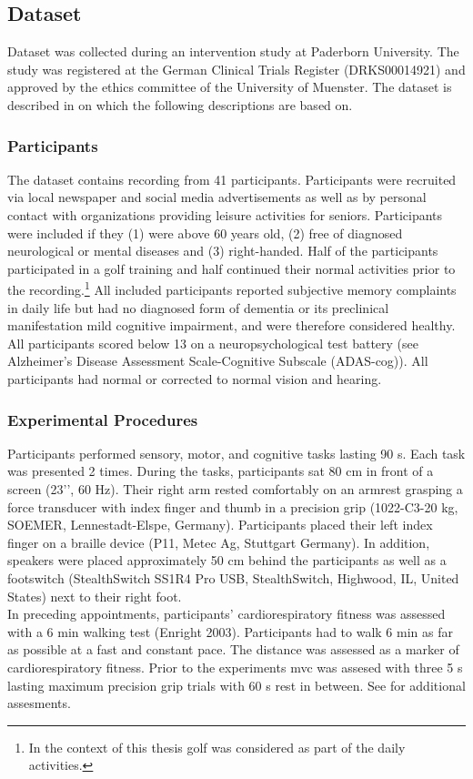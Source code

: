 \subsection{Dataset }
\label{methods:datasets:III}
Dataset  was collected during an intervention study at Paderborn University. The study was registered at the German Clinical Trials Register (DRKS00014921) and approved by the ethics committee of the University of Muenster. The dataset is described in \cite{Goelz2021b} on which the following descriptions are based on.

\subsubsection{Participants}
\label{methods:datasets:III:participants}
The dataset contains recording from 41 participants. Participants were recruited via local newspaper and social media advertisements as well as by personal contact with organizations providing leisure activities for seniors. Participants were included if they (1) were above 60 years old, (2) free of diagnosed neurological or mental diseases and (3) right-handed. Half of the participants participated in a golf training and half continued their normal activities prior to the recording.\footnote{In the context of this thesis golf was considered as part of the daily activities.} All included participants reported subjective memory complaints in daily life but had no diagnosed form of dementia or its preclinical manifestation mild cognitive impairment, and were therefore considered healthy. All participants scored below 13 on a neuropsychological test battery (see Alzheimer’s Disease Assessment Scale-Cognitive Subscale (ADAS-cog)). All participants had normal or corrected to normal vision and hearing.\\

\subsubsection{Experimental Procedures}
\label{methods:datasets:II:experiment}
Participants performed sensory, motor, and cognitive tasks lasting 90 s. Each task was presented 2 times. During the tasks, participants sat 80 cm in front of a screen (23’’, 60 Hz). Their right arm rested comfortably on an armrest grasping a force transducer with index finger and thumb in a precision grip (1022-C3-20 kg, SOEMER, Lennestadt-Elspe, Germany).
Participants placed their left index finger on a braille device (P11, Metec Ag, Stuttgart Germany). In addition, speakers were placed approximately 50 cm behind the participants as well as a footswitch (StealthSwitch SS1R4 Pro USB, StealthSwitch, Highwood, IL, United States) next to their right foot.\\
In preceding appointments, participants’ cardiorespiratory fitness was assessed with a 6 min walking test (Enright 2003). Participants had to walk 6 min as far as possible at a fast and constant pace. The distance was assessed as a marker of cardiorespiratory fitness. Prior to the experiments \gls{mvc} was assesed with three 5 s lasting maximum precision grip trials with 60 s rest in between. See \cite{Goelz2021b} for additional assesments.

